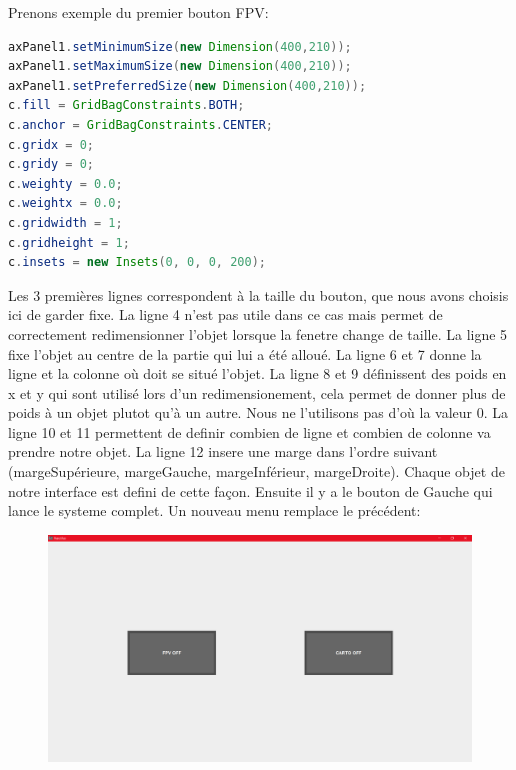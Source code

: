 \documentclass[a4paper,11pt]{report}
\begin{document}
				\newpage Prenons exemple du premier bouton FPV:
				\begin{lstlisting}[language=java]
axPanel1.setMinimumSize(new Dimension(400,210));
axPanel1.setMaximumSize(new Dimension(400,210));
axPanel1.setPreferredSize(new Dimension(400,210));
c.fill = GridBagConstraints.BOTH;
c.anchor = GridBagConstraints.CENTER;
c.gridx = 0;
c.gridy = 0;
c.weighty = 0.0;
c.weightx = 0.0;
c.gridwidth = 1;
c.gridheight = 1;
c.insets = new Insets(0, 0, 0, 200);
				\end{lstlisting}
				Les 3 premières lignes correspondent à la taille du bouton, que nous avons choisis ici de garder fixe.
				\newline La ligne 4 n'est pas utile dans ce cas mais permet de correctement redimensionner l'objet lorsque la fenetre change de taille.
				\newline La ligne 5 fixe l'objet au centre de la partie qui lui a été alloué.
				\newline La ligne 6 et 7 donne la ligne et la colonne où doit se situé l'objet.
				\newline La ligne 8 et 9 définissent des poids en x et y qui sont utilisé lors d'un redimensionement, cela permet de donner plus de poids à un objet plutot qu'à un autre. Nous ne l'utilisons pas d'où la valeur 0.
				\newline La ligne 10 et 11 permettent de definir combien de ligne et combien de colonne va prendre notre objet.
				\newline La ligne 12 insere une marge dans l'ordre suivant (margeSupérieure, margeGauche, margeInférieur, margeDroite).
				\newline Chaque objet de notre interface est defini de cette façon.
				\newline \newline Ensuite il y a le bouton de Gauche qui lance le systeme complet. Un nouveau menu remplace le précédent:
				\begin{figure}[!h]
					\begin{center}
						\includegraphics[scale=0.3]{Photos/Interface1.png}
					\end{center}
				\end{figure}
\end{document}

